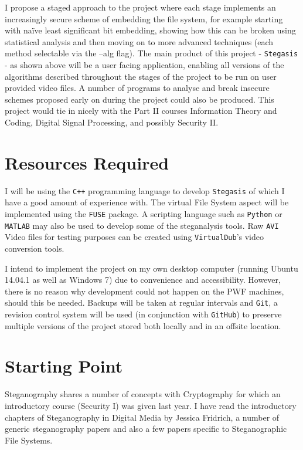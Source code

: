 \documentclass[paper=a4, fontsize=11pt,twoside]{scrartcl}
\numberwithin{table}{section}
\numberwithin{figure}{section}
\numberwithin{algorithm}{section}
\begin{document}
I propose a staged approach to the project where each stage implements an increasingly secure scheme of embedding the file system, for example starting with na\"{i}ve least significant bit embedding, showing how this can be broken using statistical analysis and then moving on to more advanced techniques (each method selectable via the --alg flag).
The main product of this project - \texttt{Stegasis} - as shown above will be a user facing application, enabling all versions of the algorithms described throughout the stages of the project to be run on user provided video files. A number of programs to analyse and break insecure schemes proposed early on during the project could also be produced.
This project would tie in nicely with the Part II courses Information Theory and Coding, Digital Signal Processing, and possibly Security II.

\section*{Resources Required}
I will be using the \texttt{C++} programming language to develop \texttt{Stegasis} of which I have a good amount of experience with. The virtual File System aspect will be implemented using the \texttt{FUSE} package. A scripting language such as \texttt{Python} or \texttt{MATLAB} may also be used to develop some of the steganalysis tools. Raw \texttt{AVI} Video files for testing purposes can be created using \texttt{VirtualDub}'s video conversion tools.

I intend to implement the project on my own desktop computer (running Ubuntu 14.04.1 as well as Windows 7) due to convenience and accessibility. However, there is no reason why development could not happen on the PWF machines, should this be needed.
Backups will be taken at regular intervals and \texttt{Git}, a revision control system will be used (in conjunction with \texttt{GitHub}) to preserve multiple versions of the project stored both locally and in an offsite location.

\section*{Starting Point}
Steganography shares a number of concepts with Cryptography for which an introductory course (Security I) was given last year. I have read the introductory chapters of Steganography in Digital Media by Jessica Fridrich, a number of generic steganography papers and also a few papers specific to Steganographic File Systems.
\end{document}
